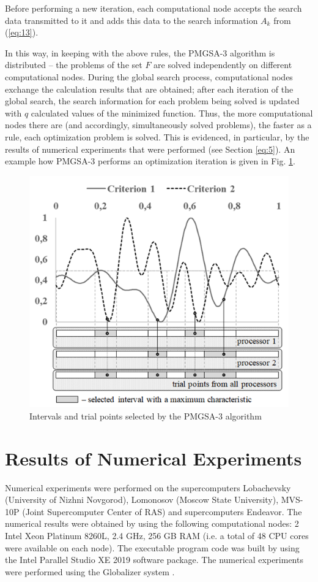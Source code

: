 \documentclass[review]{elsarticle}
\begin{document}
Before performing a new iteration, each computational node accepts the search data transmitted to it and adds this data to the search information $A_k$ from (\ref{eq:13}).
	
In this way, in keeping with the above rules, the PMGSA-3 algorithm is distributed -- the problems of the set $F$ are solved independently on different computational nodes. During the global search process, computational nodes exchange the calculation results that are obtained; after each iteration of the global search, the search information for each problem being solved is updated with $q$ calculated values of the minimized function. Thus, the more computational nodes there are (and accordingly, simultaneously solved problems), the faster as a rule, each optimization problem is solved. This is evidenced, in particular, by the results of numerical experiments that were performed (see Section \ref{eq:5}). An example how PMGSA-3 performs an optimization iteration is given in Fig. \ref{fig:4}.

\begin{figure}
  \centering
  \includegraphics[width=0.7\linewidth]{fig4}
  \caption{Intervals and trial points selected by the PMGSA-3 algorithm}
  \label{fig:4}
\end{figure}

\section{Results of Numerical Experiments}\label{sec:5}

Numerical experiments were performed on the supercomputers Lobachevsky (University of Nizhni Novgorod), Lomonosov (Moscow State University), MVS-10P (Joint Supercomputer Center of RAS) and supercomputers Endeavor. The numerical results were obtained by using the following computational nodes: 2 Intel Xeon Platinum 8260L, 2.4 GHz, 256 GB RAM (i.e. a total of 48 CPU cores were available on each node). The executable program code was built by using the Intel Parallel Studio XE 2019 software package. The numerical experiments were performed using the Globalizer system \cite{c40}.
\end{document}

